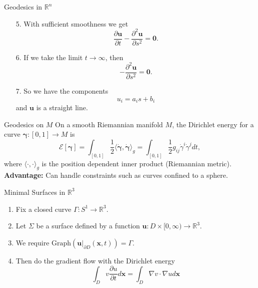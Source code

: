 \documentclass[usenames,dvipsnames]{beamer}
\theoremstyle{definition}
\theoremstyle{theorem}
\newcommand{\R}{\mathbb{R}}
\newcommand{\position}{\boldsymbol{\gamma}}
\newcommand{\velocity}{\boldsymbol{\dot{\gamma}}}
\begin{document}
    \begin{frame}{Geodesics in $\R^n$}
        \begin{itemize}
            \item[5.] With sufficient smoothness we get
            \[
            \frac{\partial \mathbf{u}}{\partial t} -\frac{\partial^2 \mathbf{u}}{\partial s^2}=\mathbf{0}.
            \]
            \item[6.] If we take the limit $t\to \infty$, then
            \[
            -\frac{\partial^2 \mathbf{u}}{\partial s^2}=\mathbf{0}.
            \]
            \item[7.] So we have the components
            \[
            u_i = a_i s + b_i
            \]
            and $\mathbf{u}$ is a straight line.
        \end{itemize}
    \end{frame}
    
    \begin{frame}{Geodesics on $M$}
        On a smooth Riemannian manifold $M$, the Dirichlet energy for a curve $\position \colon [0,1] \to M$ is
        \[
        \mathcal{E}[\position] = \int_{[0,1]} \frac{1}{2} \langle \velocity,\velocity \rangle_{g} = \int_{[0,1]} \frac{1}{2}  g_{ij} \dot{\gamma}^i \dot{\gamma}^j dt,
        \]
        where $\langle \cdot,\cdot \rangle_g$ is the position dependent inner product (Riemannian metric).\\
        \vspace*{.5cm}
        \noindent \textbf{Advantage:} Can handle constraints such as curves confined to a sphere.
    \end{frame}
    

    
    \begin{frame}{Minimal Surfaces in $\R^3$}
    \begin{enumerate}[1.]
        \item Fix a closed curve $\Gamma \colon S^1 \to \R^3$.
        \item Let $\Sigma$ be a surface defined by a function $\mathbf{u}\colon D \times [0,\infty) \to \R^3$.
        \item We require $\textrm{Graph}(\mathbf{u}|_{\partial D}(\mathbf{x},t))=\Gamma$.
        \item Then do the gradient flow with the Dirichlet energy
        \[
        \int_{D} v \frac{\partial u}{\partial t} d\mathbf{x} = \int_{D} \nabla v\cdot {\nabla u} d\mathbf{x}
        \]
    \end{enumerate}
    \end{frame}
    
\end{document}
